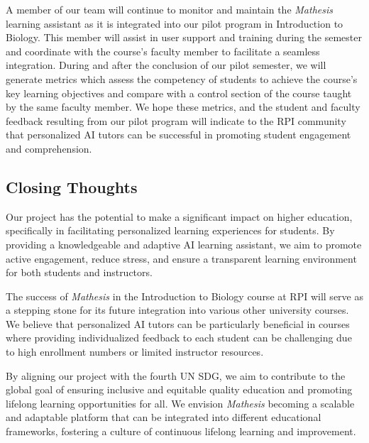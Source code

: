 \documentclass[12pt,a4paper]{article}
\begin{document}
    A member of our team will continue to monitor and maintain the \textit{Mathesis} learning assistant as it
    is integrated into our pilot program in Introduction to Biology. This member will assist in user
    support and training during the semester and coordinate with the course’s faculty member to
    facilitate a seamless integration. During and after the conclusion of our pilot semester, we will
    generate metrics which assess the competency of students to achieve the course’s key learning
    objectives and compare with a control section of the course taught by the same faculty member.
    We hope these metrics, and the student and faculty feedback resulting from our pilot program will
    indicate to the RPI community that personalized AI tutors can be successful in promoting student
    engagement and comprehension.

    \subsection{Closing Thoughts}
    Our project has the potential to make a significant impact on higher education, specifically in
    facilitating personalized learning experiences for students. By providing a knowledgeable and
    adaptive AI learning assistant, we aim to promote active engagement, reduce stress, and ensure a
    transparent learning environment for both students and instructors.

    The success of \textit{Mathesis} in the Introduction to Biology course at RPI will serve as a
    stepping stone for its future integration into various other university courses. We believe that
    personalized AI tutors can be particularly beneficial in courses where providing individualized
    feedback to each student can be challenging due to high enrollment numbers or limited instructor
    resources.

    By aligning our project with the fourth UN SDG, we aim to contribute to the global goal of
    ensuring inclusive and equitable quality education and promoting lifelong learning opportunities for
    all. We envision \textit{Mathesis} becoming a scalable and adaptable platform that can be integrated
    into different educational frameworks, fostering a culture of continuous lifelong learning and improvement.

    \pagebreak
    
    
    

    \pagebreak
\end{document}
